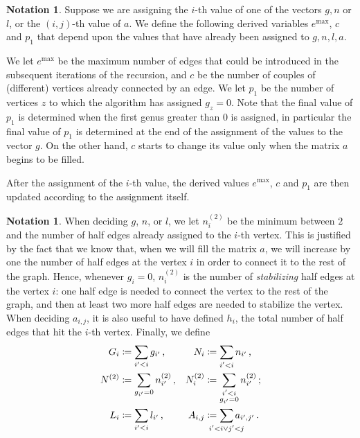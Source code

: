 \documentclass{amsart}
\theoremstyle{plain}
\theoremstyle{definition}
\newtheorem{notation}[theorem]{Notation}
\DeclareMathOperator{\MAX}{max}
\begin{document}
\begin{notation}
  Suppose we are assigning the $i$-th value of one of the vectors
  $g,n$ or $l$, or the $(i,j)$-th value of $a$. We define the
  following derived variables $e^{\MAX}$, $c$ and $p_1$ that depend
  upon the values that have already been assigned to $g,n,l,a$.

  We let $e^{\MAX}$ be the maximum number of edges that could be
  introduced in the subsequent iterations of the recursion, and $c$ be
  the number of couples of (different) vertices already connected by
  an edge. We let $p_1$ be the number of vertices $z$ to which the
  algorithm has assigned $g_z = 0$.  Note that the final value of
  $p_1$ is determined when the first genus greater than $0$ is
  assigned, in particular the final value of $p_1$ is determined at
  the end of the assignment of the values to the vector $g$.  On the
  other hand, $c$ starts to change its value only when the matrix $a$
  begins to be filled.

  After the assignment of the $i$-th value, the derived values
  $e^{\MAX}$, $c$ and $p_1$ are then updated according to the
  assignment itself.
\end{notation}

\begin{notation} \label{not:partial_assign}
  When deciding $g$, $n$, or $l$, we let $n^{(2)}_i$ be the minimum
  between $2$ and the number of half edges already assigned to the
  $i$-th vertex. This is justified by the fact that we know that, when
  we will fill the matrix $a$, we will increase by one the number of
  half edges at the vertex $i$ in order to connect it to the rest of
  the graph. Hence, whenever $g_i = 0$, $n^{(2)}_i$ is the number of
  \emph{stabilizing\/} half edges at the vertex $i$: one half edge is
  needed to connect the vertex to the rest of the graph, and then at
  least two more half edges are needed to stabilize the vertex. When
  deciding $a_{i,j}$, it is also useful to have defined $h_i$, the
  total number of half edges that hit the $i$-th vertex. Finally, we
  define
  \begin{align*}
    G_i &\coloneqq \sum_{i^\prime < i} g_{i^\prime}\,\text{,} &
    N_i &\coloneqq \sum_{\substack{i^\prime < i}} n_{i^\prime}\,\text{,}\\
    N^{(2)} &\coloneqq \sum_{g_{i^\prime} = 0} n^{(2)}_{i^\prime}\,\text{,} &
    N^{(2)}_i &\coloneqq \sum_{\substack{i^\prime < i\\g_{i^\prime} = 0}} n^{(2)}_{i^\prime}\,\text{;}\\
    L_i &\coloneqq \sum_{i^\prime < i} l_{i^\prime}\,\text{,} &
    A_{i,j} &\coloneqq \sum_{\mathclap{i^\prime < i \vee j^\prime < j}} a_{i^\prime, j^\prime}\,\text{.}
  \end{align*}
\end{notation}
\end{document}
